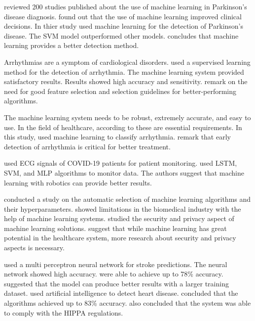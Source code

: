 \cite*{ref_paper_27} reviewed 200 studies published about the use of machine learning in Parkinson's disease diagnosis. \citeauthor{ref_paper_27} found out that the use of machine learning improved clinical decisions. In thier study \cite*{ref_paper_30} used machine learning for the detection of Parkinson's disease. The SVM model outperformed other models. \citeauthor{ref_paper_30} concludes that machine learning provides a better detection method.

Arrhythmias are a symptom of cardiological disorders. \cite*{ref_paper_28} used a supervised learning method for the detection of arrhythmia. The machine learning system provided satisfactory results. Results showed high accuracy and sensitivity. \citeauthor{ref_paper_28} remark on the need for good feature selection and selection guidelines for better-performing algorithms.

The machine learning system needs to be robust, extremely accurate, and easy to use. In the field of healthcare, according to \cite*{ref_paper_4} these are essential requirements. In this study, \citeauthor{ref_paper_4} used machine learning to classify arrhythmia. \citeauthor{ref_paper_4} remark that early detection of arrhythmia is critical for better treatment.

\cite*{ref_paper_40} used ECG signals of COVID-19 patients for patient monitoring. \citeauthor{ref_paper_40} used LSTM, SVM, and MLP algorithms to monitor data. The authors suggest that machine learning with robotics can provide better results.

\cite*{ref_paper_32} conducted a study on the automatic selection of machine learning algorithms and their hyperparameters. \citeauthor{ref_paper_32} showed limitations in the biomedical industry with the help of machine learning systems. \cite*{ref_paper_37} studied the security and privacy aspect of machine learning solutions. \citeauthor{ref_paper_37} suggest that while machine learning has great potential in the healthcare system, more research about security and privacy aspects is necessary.

\cite*{ref_paper_42} used a multi perceptron neural network for stroke predictions. The neural network showed high accuracy. \citeauthor{ref_paper_42} were able to achieve up to 78\% accuracy. \citeauthor{ref_paper_42} suggested that the model can produce better results with a larger training dataset. \cite*{ref_paper_41} used artificial intelligence to detect heart disease. \citeauthor{ref_paper_41} concluded that the algorithms achieved up to 83\% accuracy. \citeauthor{ref_paper_41} also concluded that the system was able to comply with the HIPPA regulations.

